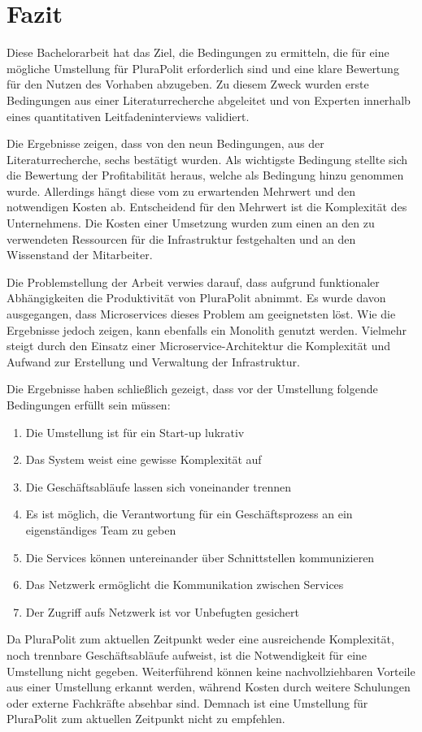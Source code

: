 \section{Fazit}

Diese Bachelorarbeit hat das Ziel, die Bedingungen zu ermitteln, die für eine mögliche Umstellung für PluraPolit erforderlich sind und eine klare Bewertung für den Nutzen des Vorhaben abzugeben. Zu diesem Zweck wurden erste Bedingungen aus einer Literaturrecherche abgeleitet und von Experten innerhalb eines quantitativen Leitfadeninterviews validiert.

Die Ergebnisse zeigen, dass von den neun Bedingungen, aus der Literaturrecherche, sechs bestätigt wurden. Als wichtigste Bedingung stellte sich die Bewertung der Profitabilität heraus, welche als Bedingung hinzu genommen wurde. Allerdings hängt diese vom zu erwartenden Mehrwert und den notwendigen Kosten ab. Entscheidend für den Mehrwert ist die Komplexität des Unternehmens. Die Kosten einer Umsetzung wurden zum einen an den zu verwendeten Ressourcen für die Infrastruktur festgehalten und an den Wissenstand der Mitarbeiter.

Die Problemstellung der Arbeit verwies darauf, dass aufgrund funktionaler Abhängigkeiten die Produktivität von PluraPolit abnimmt. Es wurde davon ausgegangen, dass Microservices dieses Problem am geeignetsten löst.
Wie die Ergebnisse jedoch zeigen, kann ebenfalls ein Monolith genutzt werden. Vielmehr steigt durch den Einsatz einer Microservice-Architektur die Komplexität und Aufwand zur Erstellung und Verwaltung der Infrastruktur.

Die Ergebnisse haben schließlich gezeigt, dass vor der Umstellung folgende Bedingungen erfüllt sein müssen:
\begin{enumerate}
	\item Die Umstellung ist für ein Start-up lukrativ
	\item Das System weist eine gewisse Komplexität auf
	\item Die Geschäftsabläufe lassen sich voneinander trennen
	\item Es ist möglich, die Verantwortung für ein Geschäftsprozess an ein eigenständiges Team zu geben
	\item Die Services können untereinander über Schnittstellen kommunizieren
	\item Das Netzwerk ermöglicht die Kommunikation zwischen Services
	\item Der Zugriff aufs Netzwerk ist vor Unbefugten gesichert
\end{enumerate}

Da PluraPolit zum aktuellen Zeitpunkt weder eine ausreichende Komplexität, noch trennbare Geschäftsabläufe aufweist, ist die Notwendigkeit für eine Umstellung nicht gegeben. Weiterführend können keine nachvollziehbaren Vorteile aus einer Umstellung erkannt werden, während Kosten durch weitere Schulungen oder externe Fachkräfte absehbar sind. Demnach ist eine Umstellung für PluraPolit zum aktuellen Zeitpunkt nicht zu empfehlen.
